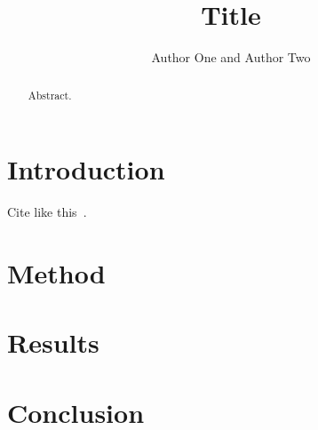 \documentclass[journal]{IEEEtran}
\title{Title}
\author{Author One and Author Two}
\begin{document}
\maketitle
\begin{abstract}
Abstract.
\end{abstract}
\section{Introduction}
Cite like this~\cite{example2026}.
\section{Method}
\section{Results}
\section{Conclusion}


\end{document}
